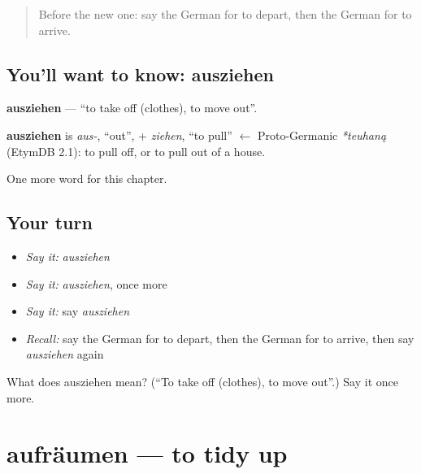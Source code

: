 \label{lesson:GE-C174-ausziehen}



\begin{quote}
Before the new one: say the German for to depart, then the German for to arrive.
\end{quote}

\subsection*{You'll want to know: ausziehen}
\textbf{ausziehen} — \textquotedblleft{}to take off (clothes), to move out\textquotedblright{}.

\begin{cousinweb}
\textbf{ausziehen} is \emph{aus-}, \textquotedblleft{}out\textquotedblright{}, + \emph{ziehen}, \textquotedblleft{}to pull\textquotedblright{} $\leftarrow$ Proto-Germanic \emph{*teuhaną} (EtymDB 2.1): to pull off, or to pull out of a house.
\end{cousinweb}

\begin{grammarlens}[title={What you've built}]
One more word for this chapter.
\end{grammarlens}

\subsection*{Your turn}
\begin{itemize}
\raggedright
  \item \emph{Say it:} \emph{ausziehen}
  \item \emph{Say it:} \emph{ausziehen}, once more
  \item \emph{Say it:} say \emph{ausziehen}
  \item \emph{Recall:} say the German for to depart, then the German for to arrive, then say \emph{ausziehen} again
\end{itemize}

\begin{tcolorbox}[breakable,colback=teal!4,colframe=teal!35!black,title={Before you move on}]
What does ausziehen mean? (\textquotedblleft{}To take off (clothes), to move out\textquotedblright{}.) Say it once more.
\end{tcolorbox}
\section[aufräumen]{aufräumen — to tidy up}


